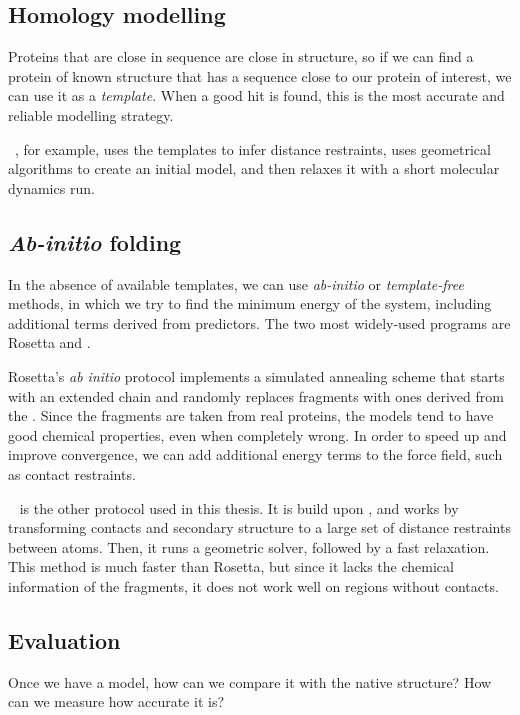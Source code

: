 \subsection{Homology modelling}
Proteins that are close in sequence are close in structure, so if we can find a protein of known structure that has a sequence close to our protein of interest, we can use it as a \emph{template}.
When a good hit is found, this is the most accurate and reliable modelling strategy.

\MODELLER~\citep{modeller}, for example, uses the templates to infer distance restraints, uses geometrical algorithms to create an initial model, and then relaxes it with a short molecular dynamics run.


\subsection{\emph{Ab-initio} folding}
In the absence of available templates, we can use \emph{ab-initio} or \emph{template-free} methods, in which we try to find the minimum energy of the system, including additional terms derived from predictors.
The two most widely-used programs are Rosetta and \CONFOLD.

Rosetta's \citep{Rosetta3}  \emph{ab initio} protocol implements a simulated annealing scheme that starts with an extended chain and randomly replaces fragments with ones derived from the \PDB.
Since the fragments are taken from real proteins, the models tend to have good chemical properties, even when completely wrong.
In order to speed up and improve convergence, we can add additional energy terms to the force field, such as contact restraints.

\CONFOLD~\citep{confold}  is the other protocol used in this thesis.
It is build upon \CNS, and works by transforming contacts and secondary structure to a large set of distance restraints between atoms.
Then, it runs a geometric solver, followed by a fast relaxation.
This method is much faster than Rosetta, but since it lacks the chemical information of the fragments, it does not work well on regions without contacts.


\subsection{Evaluation}
Once we have a model, how can we compare it with the native structure? How can we measure how accurate it is?


